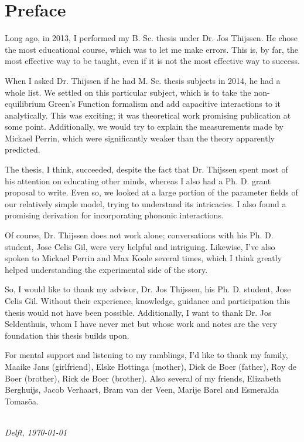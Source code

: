 \chapter*{Preface}

Long ago, in 2013, I performed my B. Sc. thesis under Dr. Jos Thijssen. He chose the most educational course, which was to let me make errors. This is, by far, the most effective way to be taught, even if it is not the most effective way to success.

When I asked Dr. Thijssen if he had M. Sc. thesis subjects in 2014, he had a whole list. We settled on this particular subject, which is to take the non-equilibrium Green's Function formalism and add capacitive interactions to it analytically.  This was exciting; it was theoretical work promising publication at some point. Additionally, we would try to explain the measurements made by Mickael Perrin, which were significantly weaker than the theory apparently predicted.

The thesis, I think, succeeded, despite the fact that Dr. Thijssen spent most of his attention on educating other minds, whereas I also had a Ph. D. grant proposal to write. Even so, we looked at a large portion of the parameter fields of our relatively simple model, trying to understand its intricacies. I also found a promising derivation for incorporating phononic interactions.

Of course, Dr. Thijssen does not work alone; conversations with his Ph. D. student, Jose Celis Gil, were very helpful and intriguing. Likewise, I've also spoken to Mickael Perrin and Max Koole several times, which I think greatly helped understanding the experimental side of the story. 

So, I would like to thank my advisor, Dr. Jos Thijssen, his Ph. D. student, Jose Celis Gil. Without their experience, knowledge, guidance and participation this thesis would not have been possible. Additionally, I want to thank Dr. Jos Seldenthuis, whom I have never met but whose work and notes are the very foundation this thesis builds upon.

For mental support and listening to my ramblings, I'd like to thank my family, Maaike Jans (girlfriend), Elske Hottinga (mother), Dick de Boer (father), Roy de Boer (brother), Rick de Boer (brother). Also several of my friends, Elizabeth Berghuijs, Jacob Verhaart, Bram van der Veen, Marije Barel and Esmeralda Tomas\"oa.


\begin{flushright}
{\makeatletter\itshape
    \@firstname\ \@lastname \\
    Delft, \today
\makeatother}
\end{flushright}

